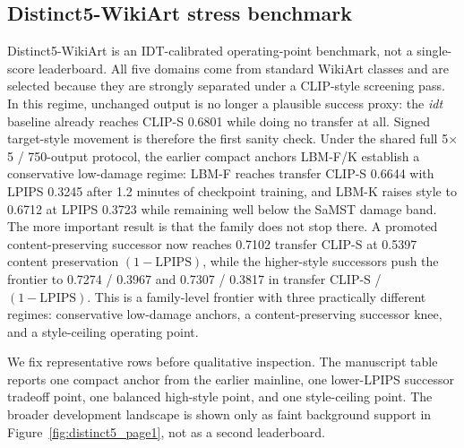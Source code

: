 \documentclass[letterpaper]{article}
\begin{document}
\subsection{Distinct5-WikiArt stress benchmark}
Distinct5-WikiArt is an IDT-calibrated operating-point benchmark, not a single-score leaderboard. All five domains come from standard WikiArt classes and are selected because they are strongly separated under a CLIP-style screening pass. In this regime, unchanged output is no longer a plausible success proxy: the \emph{idt} baseline already reaches CLIP-S 0.6801 while doing no transfer at all. Signed target-style movement is therefore the first sanity check. Under the shared full 5$\times$5 / 750-output protocol, the earlier compact anchors LBM-F/K establish a conservative low-damage regime: LBM-F reaches transfer CLIP-S 0.6644 with LPIPS 0.3245 after 1.2 minutes of checkpoint training, and LBM-K raises style to 0.6712 at LPIPS 0.3723 while remaining well below the SaMST damage band. The more important result is that the family does not stop there. A promoted content-preserving successor now reaches 0.7102 transfer CLIP-S at 0.5397 content preservation $(1-\mathrm{LPIPS})$, while the higher-style successors push the frontier to 0.7274 / 0.3967 and 0.7307 / 0.3817 in transfer CLIP-S / $(1-\mathrm{LPIPS})$. This is a family-level frontier with three practically different regimes: conservative low-damage anchors, a content-preserving successor knee, and a style-ceiling operating point.

We fix representative rows before qualitative inspection. The manuscript table reports one compact anchor from the earlier mainline, one lower-LPIPS successor tradeoff point, one balanced high-style point, and one style-ceiling point. The broader development landscape is shown only as faint background support in Figure~\ref{fig:distinct5_page1}, not as a second leaderboard.
\end{document}
